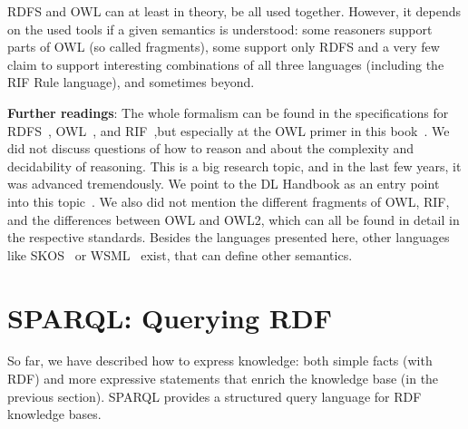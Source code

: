 %

RDFS and OWL can at least in theory, be all used together.
However, it depends on the used tools if a given semantics is understood: some reasoners support parts of OWL (so called fragments), some support only RDFS and a very few claim to support interesting combinations of all three languages (including the RIF Rule language), and sometimes beyond.

\medskip

\textbf{Further readings}:
The whole formalism can be found in the specifications for RDFS~\cite{rdfs}, OWL~\cite{owl}, and RIF~\cite{rif},but especially at the OWL primer in this book~\cite{dl-primer}.
We did not discuss questions of how to reason and about the complexity and decidability of reasoning. 
This is a big research topic, and in the last few years, it was advanced tremendously. 
We point to the DL Handbook as an entry point into this topic~\cite{dl-handbook}.
We also did not mention the different fragments of OWL, RIF, and the differences between OWL and OWL2, which can all be found in detail in the respective standards.
Besides the languages presented here, other languages like SKOS~\cite{skos} or WSML~\cite{wsml} exist, that can define other semantics.

\section{SPARQL: Querying RDF}
\label{sparql}

So far, we have described how to express knowledge: both simple facts (with RDF) and more expressive statements that enrich the knowledge base (in the previous section).
SPARQL provides a structured query language for RDF knowledge bases.

